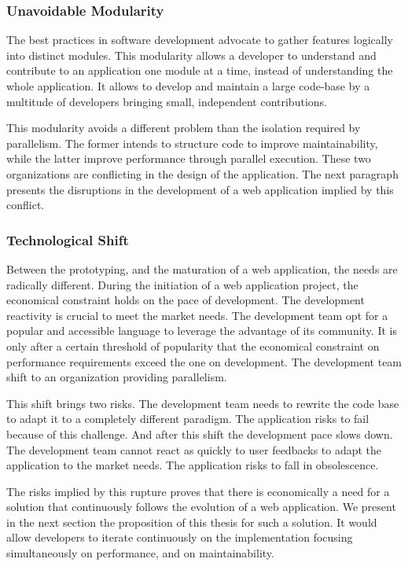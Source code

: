 \subsubsection{Unavoidable Modularity}

The best practices in software development advocate to gather features logically into distinct modules.
This modularity allows a developer to understand and contribute to an application one module at a time, instead of understanding the whole application.
It allows to develop and maintain a large code-base by a multitude of developers bringing small, independent contributions.

This modularity avoids a different problem than the isolation required by parallelism.
The former intends to structure code to improve maintainability, while the latter improve performance through parallel execution.
These two organizations are conflicting in the design of the application.
The next paragraph presents the disruptions in the development of a web application implied by this conflict.

\subsubsection{Technological Shift}

Between the prototyping, and the maturation of a web application, the needs are radically different.
During the initiation of a web application project, the economical constraint holds on the pace of development.
The development reactivity is crucial to meet the market needs.
The development team opt for a popular and accessible language to leverage the advantage of its community.
It is only after a certain threshold of popularity that the  economical constraint on performance requirements exceed the one on development.
The development team shift to an organization providing parallelism.

This shift brings two risks.
The development team needs to rewrite the code base to adapt it to a completely different paradigm.
The application risks to fail because of this challenge.
And after this shift the development pace slows down.
The development team cannot react as quickly to user feedbacks to adapt the application to the market needs.
The application risks to fall in obsolescence.

The risks implied by this rupture proves that there is economically a need for a solution that continuously follows the evolution of a web application.
We present in the next section the proposition of this thesis for such a solution.
It would allow developers to iterate continuously on the implementation focusing simultaneously on performance, and on maintainability.

